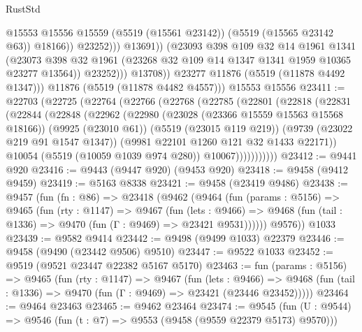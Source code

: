 \begin{lexlean}{RustStd}
\begin{coremodule}
                              @15553
                              @15556
                              @15559
                              (@5519 (@15561 @23142))
                              (@5519 (@15565 @23142 @63))
                              @18166))
                          @23252)))
                    @13691))
                (@23093
                  @398
                  @109
                  @32
                  @14
                  @1961
                  @1341
                  (@23073
                    @398
                    @32
                    @1961
                    (@23268 @32 @109 @14 @1347 @1341 @1959 @10365 @23277 @13564))
                  @23252)))
            @13708))
        @23277
        @11876
        (@5519 (@11878 @4492 @1347)))
      @11876
      (@5519 (@11878 @4482 @4557)))
    @15553
    @15556
@23411 := @22703
    (@22725
      (@22764
        (@22766
          (@22768
            (@22785
              (@22801
                (@22818
                  (@22831
                    (@22844
                      (@22848
                        (@22962
                          (@22980
                            (@23028 (@23366 @15559 @15563 @15568 @18166))
                            (@9925 (@23010 @61))
                            (@5519 (@23015 @119 @219))
                            (@9739 (@23022 @219 @91 @1547 @1347))
                            (@9981 @22101 @1260 @121 @32 @1433 @22171))
                          @10054
                          (@5519 (@10059 @1039 @974 @280))
                          @10067)))))))))))
@23412 := @9441 @920
@23416 := @9443 (@9447 @920) (@9453 @920)
@23418 := @9458 (@9412 @9459)
@23419 := @5163 @8338
@23421 := @9458 (@23419 @9486)
@23438 := @9457
    (fun (fn : @86) =>
    @23418
      (@9462
        (@9464
          (fun (params : @5156) =>
          @9465
            (fun (rty : @1147) =>
            @9467
              (fun (lets : @9466) =>
              @9468 (fun (tail : @1336) => @9470 (fun (Γ : @9469) => @23421 @9531))))))
        @9576))
    @1033
@23439 := @9582 @9414
@23442 := @9498 (@9499 @1033) @22379
@23446 := @9458 (@9490 (@23442 @9506) @9510)
@23447 := @9522 @1033
@23452 := @9519 (@9521 @23447 @22382 @5167 @5170)
@23463 := fun (params : @5156) =>
  @9465
    (fun (rty : @1147) =>
    @9467
      (fun (lets : @9466) =>
      @9468 (fun (tail : @1336) => @9470 (fun (Γ : @9469) => @23421 (@23446 @23452)))))
@23464 := @9464 @23463
@23465 := @9462 @23464
@23474 := @9545
    (fun (U : @9544) => @9546 (fun (t : @7) => @9553 (@9458 (@9559 @22379 @5173) @9570)))

\end{coremodule}
\end{lexlean}
